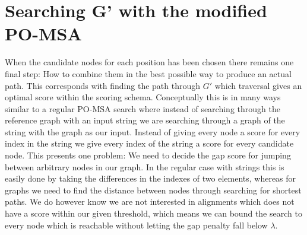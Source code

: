 \documentclass{article}
\begin{document}
\section{Searching G' with the modified PO-MSA}
When the candidate nodes for each position has been chosen there remains one final step: How to combine them in the best possible way to produce an actual path. This corresponds with finding the path through $G'$ which traversal gives an optimal score within the scoring schema. Conceptually this is in many ways similar to a regular PO-MSA search where instead of searching through the reference graph with an input string we are searching through a graph of the string with the graph as our input. Instead of giving every node a score for every index in the string we give every index of the string a score for every candidate node. This presents one problem: We need to decide the gap score for jumping between arbitrary nodes in our graph. In the regular case with strings this is easily done by taking the differences in the indexes of two elements, whereas for graphs we need to find the distance between nodes through searching for shortest paths. We do however know we are not interested in alignments which does not have a score within our given threshold, which means we can bound the search to every node which is reachable without letting the gap penalty fall below $\lambda$.\\
\par\noindent
\end{document}
